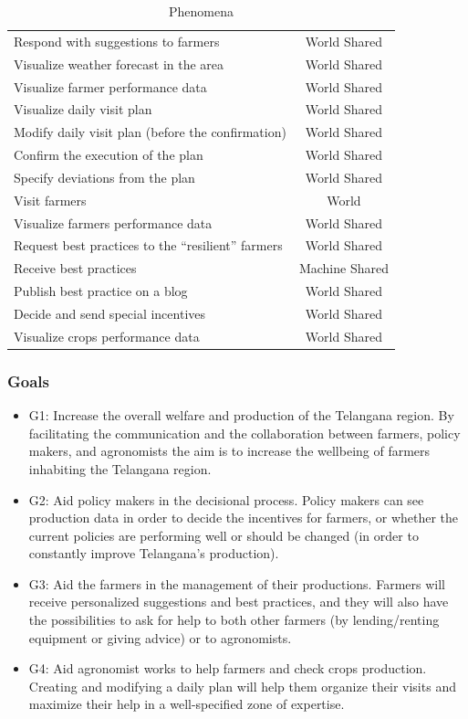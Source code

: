 \documentclass{article}
\begin{document}
\begin{table}[h]
\begin{tabular}{l|c}
            Respond with suggestions to farmers & World Shared \\
            Visualize weather forecast in the area & World Shared \\
            Visualize farmer performance data & World Shared \\
            Visualize daily visit plan & World Shared \\
            Modify daily visit plan (before the confirmation) & World Shared \\
            Confirm the execution of the plan & World Shared \\
            Specify deviations from the plan & World Shared \\
            Visit farmers & World \\
        \hline
            Visualize farmers performance data & World Shared \\
            Request best practices to the “resilient” farmers & World Shared \\
            Receive best practices & Machine Shared \\
            Publish best practice on a blog & World Shared \\
            Decide and send special incentives & World Shared \\
            Visualize crops performance data & World Shared \\
    
        \end{tabular}
        \caption{Phenomena}
    \end{table}


\subsubsection{Goals}
    \begin{itemize}
        \item G1: Increase the overall welfare and production of the Telangana region.
        By facilitating the communication and the collaboration between farmers, policy makers, and agronomists the aim is to increase the wellbeing of farmers inhabiting the Telangana region.
        \item G2: Aid policy makers in the decisional process.
        Policy makers can see production data in order to decide the incentives for farmers, or whether the current policies are performing well or should be changed (in order to constantly improve Telangana’s production).
        \item G3: Aid the farmers in the management of their productions.
        Farmers will receive personalized suggestions and best practices, and they will also have the possibilities to ask for help to both other farmers (by lending/renting equipment or giving advice) or to agronomists.
        \item G4: Aid agronomist works to help farmers and check crops production.
        Creating and modifying a daily plan will help them organize their visits and maximize their help in a well-specified zone of expertise.
    \end{itemize}
\end{document}
